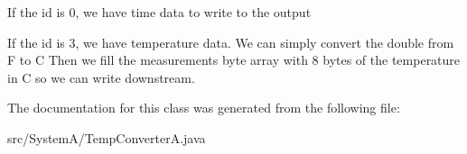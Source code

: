 If the id is 0, we have time data to write to the output

If the id is 3, we have temperature data. We can simply convert the double from F to C Then we fill the measurements byte array with 8 bytes of the temperature in C so we can write downstream.

The documentation for this class was generated from the following file\+:\begin{DoxyCompactItemize}
\item 
src/\+System\+A/Temp\+Converter\+A.\+java\end{DoxyCompactItemize}

